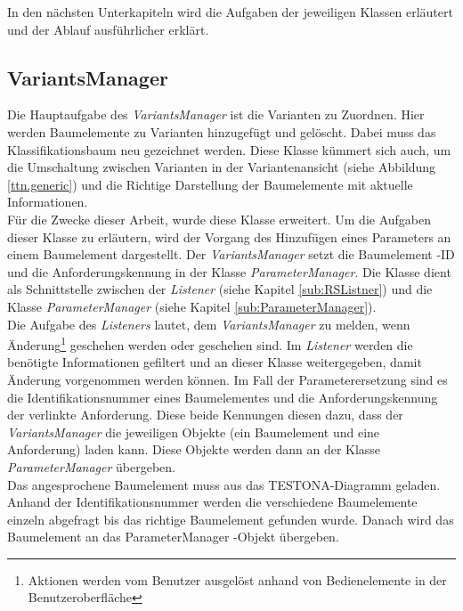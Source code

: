 In den nächsten Unterkapiteln wird die Aufgaben der jeweiligen Klassen erläutert und der Ablauf ausführlicher erklärt.


\subsection{VariantsManager}\label{sub.VariantsManager}
Die Hauptaufgabe des \textit{VariantsManager} ist die Varianten zu Zuordnen. Hier werden Baumelemente zu Varianten hinzugefügt und gelöscht. Dabei muss das Klassifikationsbaum neu gezeichnet werden. Diese Klasse kümmert sich auch, um die Umschaltung zwischen Varianten in der Variantenansicht (siehe Abbildung \ref{ttn.generic}) und die Richtige Darstellung der Baumelemente mit aktuelle Informationen.\\


Für die  Zwecke dieser Arbeit, wurde diese Klasse erweitert. Um die Aufgaben dieser Klasse zu erläutern, wird der Vorgang des Hinzufügen eines Parameters an einem Baumelement dargestellt. Der \textit{VariantsManager} setzt die Baumelement -ID und die Anforderungskennung in der Klasse \textit{ParameterManager}. Die Klasse dient als Schnittstelle zwischen der \textit{Listener} (siehe Kapitel \ref{sub:RSListner}) und die Klasse \textit{ParameterManager}  (siehe Kapitel \ref{sub:ParameterManager}).\\


Die Aufgabe des \textit{Listeners} lautet, dem \textit{VariantsManager} zu melden, wenn Änderung\footnote{Aktionen werden vom Benutzer ausgelöst anhand von Bedienelemente in der Benutzeroberfläche} geschehen werden oder geschehen sind. Im \textit{Listener} werden die benötigte Informationen gefiltert und an dieser Klasse weitergegeben, damit Änderung vorgenommen werden können. Im Fall der Parameterersetzung sind es die Identifikationsnummer eines Baumelementes und die Anforderungskennung der verlinkte Anforderung. Diese beide Kennungen diesen dazu, dass der \textit{VariantsManager} die jeweiligen Objekte (ein Baumelement und eine Anforderung) laden kann. Diese Objekte werden dann an der Klasse \textit{ParameterManager} übergeben.\\


Das angesprochene Baumelement muss aus das TESTONA-Diagramm geladen. Anhand der Identifikationsnummer werden die verschiedene Baumelemente einzeln abgefragt bis das richtige Baumelement gefunden wurde. Danach wird das Baumelement an das ParameterManager -Objekt übergeben.\\


